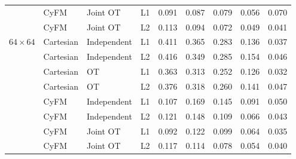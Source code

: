 \begin{table}[h]
{\begin{tabular}{llllccccc}
         & CyFM & Joint OT & L1 & 0.091 & 0.087 & 0.079 & 0.056 & 0.070 \\
         & CyFM & Joint OT & L2 & 0.113 & 0.094 & 0.072 & 0.049 & 0.041 \\
        \midrule
        $64\times64$ & Cartesian & Independent & L1 & 0.411 & 0.365 & 0.283 & 0.136 & 0.037 \\
         & Cartesian & Independent & L2 & 0.416 & 0.349 & 0.285 & 0.154 & 0.046 \\
         & Cartesian & OT & L1 & 0.363 & 0.313 & 0.252 & 0.126 & 0.032 \\
         & Cartesian & OT & L2 & 0.376 & 0.318 & 0.260 & 0.141 & 0.047 \\
         & CyFM & Independent & L1 & 0.107 & 0.169 & 0.145 & 0.091 & 0.050 \\
         & CyFM & Independent & L2 & 0.121 & 0.148 & 0.109 & 0.066 & 0.043 \\
         & CyFM & Joint OT & L1 & 0.092 & 0.122 & 0.099 & 0.064 & 0.035 \\
         & CyFM & Joint OT & L2 & 0.117 & 0.114 & 0.078 & 0.054 & 0.040 \\
        \bottomrule
    \end{tabular}
    }
    \vspace{1mm}
\end{table}
